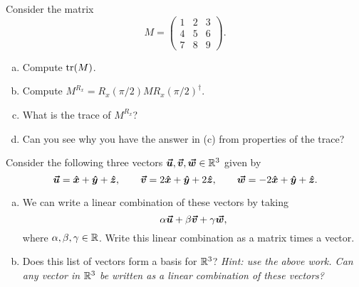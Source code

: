 \documentclass[12pt]{article} %
\begin{document}
\begin{problem}
Consider the matrix 
\[
M = \begin{pmatrix} 1 & 2 & 3 \\ 4 & 5 & 6 \\ 7 & 8 & 9 \end{pmatrix}.
\]
\begin{enumerate}[(a)]
    \item Compute $\mathrm{tr}(M)$. 
    \item Compute $M^{R_x}=R_x(\pi/2)MR_x(\pi/2)^\dagger$.
    \item What is the trace of $M^{R_x}$?
    \item Can you see why you have the answer in (c) from properties of the trace?
\end{enumerate}
\end{problem}


\begin{problem}
Consider the following three vectors $\boldsymbol{\boldsymbol{\vec{u}}},\boldsymbol{\boldsymbol{\vec{v}}},\boldsymbol{\boldsymbol{\vec{w}}}\in \mathbb{R}^3$ given by
\[
\boldsymbol{\boldsymbol{\vec{u}}} = \boldsymbol{\hat{x}} + \boldsymbol{\hat{y}} +\boldsymbol{\hat{z}}, \qquad \boldsymbol{\boldsymbol{\vec{v}}} = 2\boldsymbol{\hat{x}} + \boldsymbol{\hat{y}} + 2\boldsymbol{\hat{z}}, \qquad \boldsymbol{\boldsymbol{\vec{w}}} = -2\boldsymbol{\hat{x}} + \boldsymbol{\hat{y}} +\boldsymbol{\hat{z}}. 
\]
\begin{enumerate}[(a)]
    \item We can write a linear combination of these vectors by taking
    \[
    \alpha \boldsymbol{\boldsymbol{\vec{u}}} + \beta \boldsymbol{\boldsymbol{\vec{v}}} + \gamma \boldsymbol{\boldsymbol{\vec{w}}},
    \]
    where $\alpha,\beta,\gamma \in \mathbb{R}$.  Write this linear combination as a matrix times a vector.
    \item Does this list of vectors form a basis for $\mathbb{R}^3$? \emph{Hint: use the above work. Can any vector in $\mathbb{R}^3$ be written as a linear combination of these vectors?}
\end{enumerate}
\end{problem}
\end{document}
